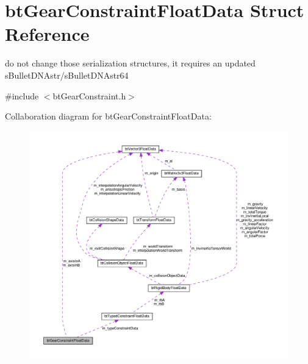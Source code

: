 \hypertarget{structbtGearConstraintFloatData}{}\section{bt\+Gear\+Constraint\+Float\+Data Struct Reference}
\label{structbtGearConstraintFloatData}


do not change those serialization structures, it requires an updated s\+Bullet\+D\+N\+Astr/s\+Bullet\+D\+N\+Astr64  




{\ttfamily \#include $<$bt\+Gear\+Constraint.\+h$>$}



Collaboration diagram for bt\+Gear\+Constraint\+Float\+Data\+:
\nopagebreak
\begin{figure}[H]
\begin{center}
\leavevmode
\includegraphics[width=350pt]{structbtGearConstraintFloatData__coll__graph}
\end{center}
\end{figure}
